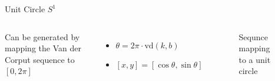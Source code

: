 \documentclass[10pt,ignorenonframetext,serif,onlymath]{beamer}
\begin{document}
\begin{frame}{Unit Circle \(S^1\)}
\protect\hypertarget{unit-circle-s1}{}

\begin{columns}


Can be generated by mapping the Van der Corput sequence to \([0, 2\pi]\)

\begin{itemize}
\item
  \(\theta = 2\pi \cdot \mathrm{vd}(k,b)\)
\item
  \([x, y] = [\cos\theta, \sin\theta]\)
\end{itemize}


\begin{figure}[hp]
\centering

\caption{Sequnce mapping to a unit circle}%
\label{fig:circle}
\end{figure}

\end{columns}

\end{frame}
\end{document}
